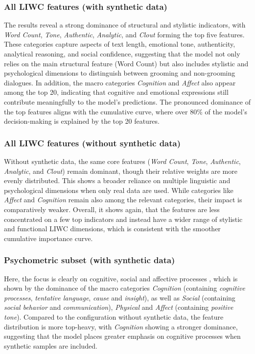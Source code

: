 \subsubsection{All LIWC features (with synthetic data)}
The results reveal a strong dominance of structural and stylistic indicators, with \textit{Word Count}, \textit{Tone}, \textit{Authentic}, \textit{Analytic}, and \textit{Clout} forming the top five features. These categories capture aspects of text length, emotional tone, authenticity, analytical reasoning, and social confidence, suggesting that the model not only relies on the main structural feature (Word Count) but also includes stylistic and psychological dimensions to distinguish between grooming and non-grooming dialogues. In addition, the macro categories \textit{Cognition} and \textit{Affect} also appear among the top 20, indicating that cognitive and emotional expressions still contribute meaningfully to the model’s predictions. The pronounced dominance of the top features aligns with the cumulative curve, where over 80\% of the model’s decision-making is explained by the top 20 features.

\subsubsection{All LIWC features (without synthetic data)}
Without synthetic data, the same core features (\textit{Word Count}, \textit{Tone}, \textit{Authentic}, \textit{Analytic}, and \textit{Clout}) remain dominant, though their relative weights are more evenly distributed. This shows a broader reliance on multiple linguistic and psychological dimensions when only real data are used. While categories like \textit{Affect} and \textit{Cognition} remain also among the relevant categories, their impact is comparatively weaker. Overall, it shows again, that the features are less concentrated on a few top indicators and instead have a wider range of stylistic and functional LIWC dimensions, which is consistent with the smoother cumulative importance curve.

\subsubsection{Psychometric subset (with synthetic data)}
Here, the focus is clearly on cognitive, social and affective processes , which is shown by the dominance of the macro categories \textit{Cognition} (containing \textit{cognitive processes}, \textit{tentative language}, \textit{cause} and \textit{insight}), as well as \textit{Social} (containing  \textit{social behavior} and  \textit{communication}), \textit{Physical} and \textit{Affect} (containing \textit{positive tone}). Compared to the configuration without synthetic data, the feature distribution is more top-heavy, with \textit{Cognition} showing a stronger dominance, suggesting that the model places greater emphasis on cognitive processes when synthetic samples are included.

